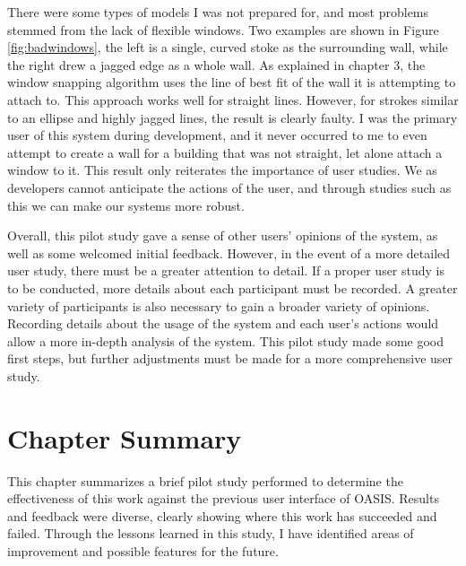 There were some types of models I was not prepared for, and most problems stemmed from the lack of flexible windows. Two examples are shown in Figure \ref{fig:badwindows}, the left is a single, curved stoke as the surrounding wall, while the right drew a jagged edge as a whole wall. As explained in chapter 3, the window snapping algorithm uses the line of best fit of the wall it is attempting to attach to. This approach works well for straight lines. However, for strokes similar to an ellipse and highly jagged lines, the result is clearly faulty. I was the primary user of this system during development, and it never occurred to me to even attempt to create a wall for a building that was not straight, let alone attach a window to it. This result only reiterates the importance of user studies. We as developers cannot anticipate the actions of the user, and through studies such as this we can make our systems more robust.

Overall, this pilot study gave a sense of other users' opinions of the system, as well as some welcomed initial feedback. However, in the event of a more detailed user study, there must be a greater attention to detail. If a proper user study is to be conducted, more details about each participant must be recorded. A greater variety of participants is also necessary to gain a broader variety of opinions. Recording details about the usage of the system and each user's actions would allow a more in-depth analysis of the system. This pilot study made some good first steps, but further adjustments must be made for a more comprehensive user study.

\section{Chapter Summary}

This chapter summarizes a brief pilot study performed to determine the effectiveness of this work against the previous user interface of OASIS. Results and feedback were diverse, clearly showing where this work has succeeded and failed. Through the lessons learned in this study, I have identified areas of improvement and possible features for the future. 
